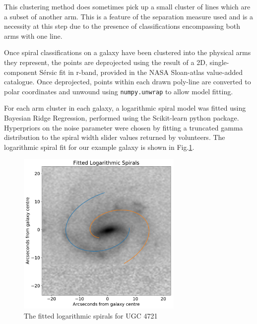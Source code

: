 \documentclass[../main.tex]{subfiles}
\begin{document}
This clustering method does sometimes pick up a small cluster of lines which are a subset of another arm. This is a feature of the separation measure used and is a necessity at this step due to the presence of classifications encompassing both arms with one line.

Once spiral classifications on a galaxy have been clustered into the physical arms they represent, the points are deprojected using the result of a 2D, single-component S\'ersic fit in r-band, provided in the NASA Sloan-atlas value-added catalogue. Once deprojected, points within each drawn poly-line are converted to polar coordinates and unwound using \texttt{numpy.unwrap} to allow model fitting.

For each arm cluster in each galaxy, a logarithmic spiral model was fitted using Bayesian Ridge Regression, performed using the Scikit-learn python package. Hyperpriors on the noise parameter were chosen by fitting a truncated gamma distribution  to the spiral width slider values returned by volunteers. The logarithmic spiral fit for our example  galaxy is shown in Fig.\ref{fig:log_spirals}.

\begin{figure}
  \includegraphics[width=8cm]{images__results/log_spirals.pdf}
  \caption{The fitted logarithmic spirals for UGC 4721}
  \label{fig:log_spirals}
\end{figure}
\end{document}
